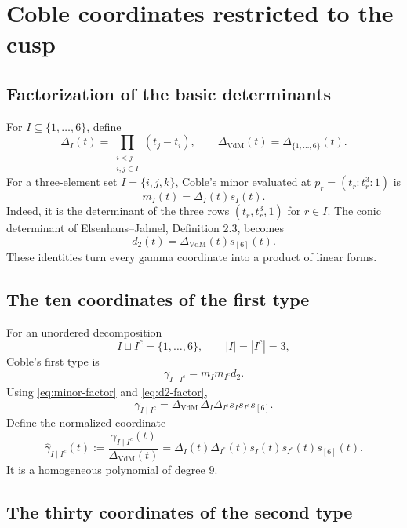 \documentclass[11pt]{article}
\newcommand{\gamhat}{\widehat{\gamma}}
\newcommand{\Deltav}{\Delta_{\mathrm{VdM}}}
\begin{document}
\section{Coble coordinates restricted to the cusp}
\label{sec:normalized-gammas}

\subsection{Factorization of the basic determinants}

For $I\subseteq\{1,\ldots,6\}$, define
\[
  \Delta_I(t)=\prod_{\substack{i<j\\i,j\in I}}(t_j-t_i),
  \qquad
  \Deltav(t)=\Delta_{\{1,\ldots,6\}}(t).
\]
For a three-element set $I=\{i,j,k\}$, Coble's minor evaluated at
$p_r=(t_r:t_r^3:1)$ is
\begin{equation}
  m_I(t)=\Delta_I(t)s_I(t).
  \label{eq:minor-factor}
\end{equation}
Indeed, it is the determinant of the three rows
$(t_r,t_r^3,1)$ for $r\in I$.  The conic determinant of
Elsenhans--Jahnel, Definition 2.3, becomes
\begin{equation}
  d_2(t)=\Deltav(t)s_{[6]}(t).
  \label{eq:d2-factor}
\end{equation}
These identities turn every gamma coordinate into a product of linear forms.

\subsection{The ten coordinates of the first type}

For an unordered decomposition
\[
  I\sqcup I^c=\{1,\ldots,6\},\qquad |I|=|I^c|=3,
\]
Coble's first type is
\[
  \gamma_{I\mid I^c}=m_I m_{I^c}d_2.
\]
Using \eqref{eq:minor-factor} and \eqref{eq:d2-factor},
\[
  \gamma_{I\mid I^c}
  =\Deltav\,\Delta_I\Delta_{I^c}s_Is_{I^c}s_{[6]}.
\]
Define the normalized coordinate
\begin{equation}
 \boxed{
  \gamhat_{I\mid I^c}(t)
  :=\frac{\gamma_{I\mid I^c}(t)}{\Deltav(t)}
  =\Delta_I(t)\Delta_{I^c}(t)s_I(t)s_{I^c}(t)s_{[6]}(t).
 }
 \label{eq:gammahat-I}
\end{equation}
It is a homogeneous polynomial of degree $9$.

\subsection{The thirty coordinates of the second type}
\end{document}
